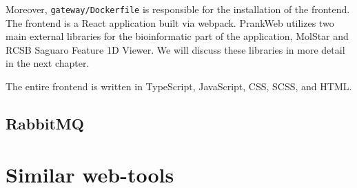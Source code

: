 Moreover, \texttt{gateway/Dockerfile} is responsible for the installation of the frontend. The frontend is a React application built via webpack. PrankWeb utilizes two main external libraries for the bioinformatic part of the application, MolStar and RCSB Saguaro Feature 1D Viewer. We will discuss these libraries in more detail in the next chapter.

The entire frontend is written in TypeScript, JavaScript, CSS, SCSS, and HTML.

\subsection{RabbitMQ}


\section{Similar web-tools}

